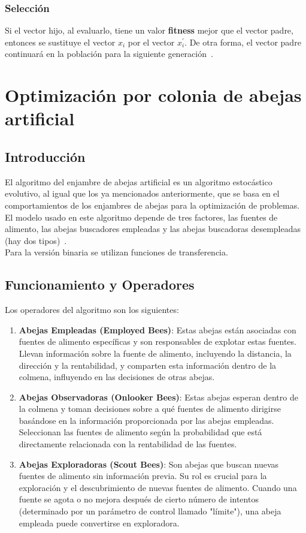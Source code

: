 \subsubsection{Selección}
Si el vector hijo, al evaluarlo, tiene un valor \textbf{fitness} mejor que el vector padre, entonces se sustituye el vector $x_i$ por el vector $x^\prime_i$. De otra forma, el vector padre continuará en la población para la siguiente generación~\cite{storn_differential_1997}.

\section{Optimización por colonia de abejas artificial}
\subsection{Introducción}
El algoritmo del enjambre de abejas artificial es un algoritmo estocástico evolutivo, al igual que los ya mencionados anteriormente, que se basa en el comportamientos de los enjambres de abejas para la optimización de problemas. El modelo usado en este algoritmo depende de tres factores, las fuentes de alimento, las abejas buscadores empleadas y las abejas buscadoras desempleadas (hay dos tipos)~\cite{karaboga_idea_nodate}.\\[6pt]
Para la versión binaria se utilizan funciones de transferencia.

\subsection{Funcionamiento y Operadores}
Los operadores del algoritmo son los siguientes:
\begin{enumerate}
    \item \textbf{Abejas Empleadas (Employed Bees)}: Estas abejas están asociadas con fuentes de alimento específicas y son responsables de explotar estas fuentes. Llevan información sobre la fuente de alimento, incluyendo la distancia, la dirección y la rentabilidad, y comparten esta información dentro de la colmena, influyendo en las decisiones de otras abejas.

    \item \textbf{Abejas Observadoras (Onlooker Bees)}: Estas abejas esperan dentro de la colmena y toman decisiones sobre a qué fuentes de alimento dirigirse basándose en la información proporcionada por las abejas empleadas. Seleccionan las fuentes de alimento según la probabilidad que está directamente relacionada con la rentabilidad de las fuentes.

    \item \textbf{Abejas Exploradoras (Scout Bees)}: Son abejas que buscan nuevas fuentes de alimento sin información previa. Su rol es crucial para la exploración y el descubrimiento de nuevas fuentes de alimento. Cuando una fuente se agota o no mejora después de cierto número de intentos (determinado por un parámetro de control llamado "límite"), una abeja empleada puede convertirse en exploradora.
\end{enumerate}

